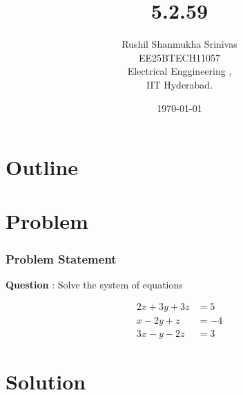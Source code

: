\documentclass{beamer}
\title{5.2.59}
\author{Rushil Shanmukha Srinivas \\EE25BTECH11057 \\ Electrical Enggineering ,\\IIT Hyderabad.}
\date{\today}
\numberwithin{equation}{section}
\theoremstyle{remark}
\begin{document}
 

\begin{frame}
\titlepage
\end{frame}

\section*{Outline}
\begin{frame}
\tableofcontents
\end{frame}
\section{Problem}
\begin{frame}
\frametitle{Problem Statement}
\textbf{Question} : Solve the system of equations

\begin{align}
2x +3y + 3z &= 5\\
x -2y +z &= -4\\
3x -y -2z &= 3
\end{align}

\end{frame}
\section{Solution}
\end{document}
